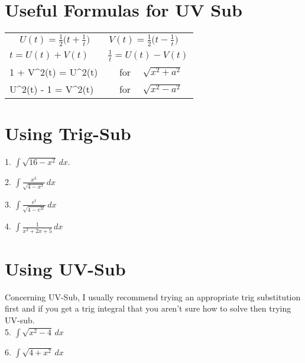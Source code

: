 \documentclass[letterpaper, fontsize=11pt]{scrartcl} %
\numberwithin{equation}{section} %
\numberwithin{figure}{section} %
\numberwithin{table}{section} %
\begin{document}
\section*{Useful Formulas for UV Sub}

\begin{center}\tabulinesep=5pt
\begin{tabu} to 0.8\linewidth { X[1,$$c] X[1,c] X[1,c] }
   \\
  
   \\
  1 + V^2(t) = U^2(t) & for & $\sqrt{x^2 + a^2}$ \\
  U^2(t) - 1 = V^2(t) & for & $\sqrt{x^2 - a^2}$ \\
\end{tabu}
\end{center}

\vfill\vfill

\newpage

\section*{Using Trig-Sub}

1. \quad $\displaystyle \int \sqrt{16 - x^2}\,dx$.

\vfill

2. \quad $\displaystyle \int \frac{x^3}{\sqrt{4 - x^2}}\,dx$

\vfill

3. \quad $\displaystyle \int \frac{e^t}{\sqrt{4 - e^{2t}}}\,dx$

\vfill

4. \quad $\displaystyle \int \frac{1}{x^2 + 2x + 5}\,dx$

\vfill

\newpage

\section*{Using UV-Sub}

Concerning UV-Sub, I usually recommend trying an appropriate trig substitution first and if you get a trig integral that you aren't sure how to solve then trying UV-sub.\\

5. \quad $\displaystyle \int \sqrt{x^2 - 4} \,dx$

\vfill

6. \quad $\displaystyle \int \sqrt{4 + x^2} \,dx$

\vfill
\end{document}
